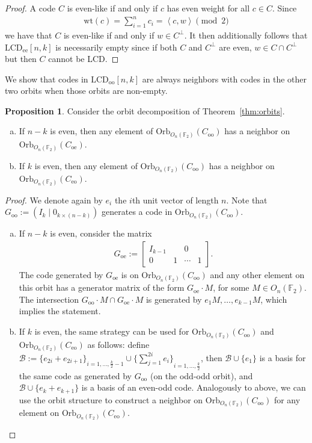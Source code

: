 \documentclass[11pt]{article}
\theoremstyle{definition}
\newtheorem{proposition}[theorem]{Proposition}
\newcommand{\F}{\mathbb{F}}
\newcommand{\Orb}{\mathrm{Orb}}
\newcommand{\Wt}{\mathrm{wt}}
\newcommand{\Ang}[1]{\left\langle#1\right\rangle}
\newcommand{\LCDoo}[2]{\mathrm{LCD}_{\mathrm{oo}} [#1, #2]}
\newcommand{\LCDee}[2]{\mathrm{LCD}_{\mathrm{ee}} [#1, #2]}
\newcommand{\CodeCeo}{C_{\mathrm{eo}}}
\newcommand{\CodeCoo}{C_{\mathrm{oo}}}
\newcommand{\CodeCoe}{C_{\mathrm{oe}}}
\newcommand{\MatGoo}{G_{\mathrm{oo}}}
\newcommand{\MatGoe}{G_{\mathrm{oe}}}
\newcommand{\CurB}{\mathcal{B}}
\newcommand{\Ort}{O}
\begin{document}
\begin{proof}
	A code $C$ is even-like if and only if $c$ has even weight for all $c \in C$.
	Since
	\begin{align*}
		\Wt(c) = \sum_{i = 1}^n c_i = \Ang{c, w}  \pmod{2}
	\end{align*}
	we have that $C$ is even-like if and only if $w \in C^{\perp}$.
	It then additionally follows that $\LCDee{n}{k}$ is necessarily empty since if both $C$ and $C^{\perp}$ are even, $w \in C \cap C^{\perp}$ but then $C$ cannot be LCD\@.
\end{proof}

We show that codes in $\LCDoo{n}{k}$ are always neighbors with codes in the other two orbits when those orbits are non-empty.

\begin{proposition}%
	Consider the orbit decomposition of Theorem~\ref{thm:orbits}.
	\begin{enumerate}[(a)]
		\item If $n - k$ is even, then any element of $\Orb_{\Ort_n(\F_2)}(\CodeCoo)$ has a neighbor on $\Orb_{\Ort_n(\F_2)}(\CodeCoe)$.
		\item If $k$ is even, then any element of $\Orb_{\Ort_n(\F_2)}(\CodeCoo)$ has a neighbor on $\Orb_{\Ort_n(\F_2)}(\CodeCeo)$.
	\end{enumerate}
\end{proposition}

\begin{proof}
	We denote again by $e_i$ the $i$th unit vector of length $n$. 
	Note that $\MatGoo := (I_k \mid 0_{k \times (n - k)})$ generates a code in $\Orb_{\Ort_n(\F_2)}(\CodeCoo)$.
	\begin{enumerate}[(a)]
		\item If $n - k$ is even, consider the matrix 
			\begin{align*}
				\MatGoe := \begin{bmatrix}
					I_{k-1} &   & 0	  & \\
						  0 & 1 & \cdots & 1
				\end{bmatrix}
				.
			\end{align*}
			The code generated by $\MatGoe$ is on $\Orb_{\Ort_n(\F_2)}(\CodeCoo)$ and any other element on this orbit has a generator matrix of the form $\MatGoe \cdot M$, for some $M\in \Ort_n(\F_2)$. 
			The intersection $\MatGoo \cdot M\cap \MatGoe \cdot M$ is generated by $e_1 M, \ldots, e_{k-1} M$, which implies the statement.
		\item If $k$ is even, the same strategy can be used for $\Orb_{\Ort_n(\F_2)}(\CodeCoo)$ and $\Orb_{\Ort_n(\F_2)}(\CodeCeo)$ as follows: define $\CurB := {\{e_{2i} + e_{2i + 1}\}}_{i = 1, \ldots, \frac{k}{2} - 1} \cup {\{\sum_{j = 1}^{2i} e_i\}}_{i = 1, \ldots, \frac{k}{2}}$, then $\CurB \cup \{e_1\}$ is a basis for the same code as generated by $\MatGoo$ (on the odd-odd orbit), and $\CurB \cup \{e_k + e_{k + 1}\}$ is a basis of an even-odd code. Analogously to above, we can use the orbit structure to construct a neighbor on $\Orb_{\Ort_n(\F_2)}(\CodeCoo)$ for any element on $\Orb_{\Ort_n(\F_2)}(\CodeCeo)$.
			\qedhere{}
	\end{enumerate}
\end{proof}
\end{document}
